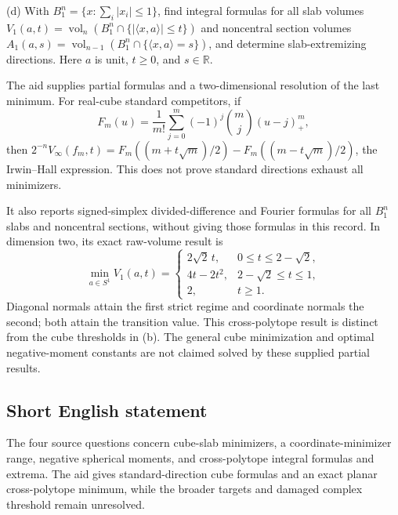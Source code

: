 \documentclass[11pt]{article}
\newcommand{\R}{\mathbb{R}}
\begin{document}
(d) With $B_1^n=\{x:\sum_i|x_i|\leq1\}$, find integral formulas for all slab volumes
$V_1(a,t)=\operatorname{vol}_n(B_1^n\cap\{|\langle x,a\rangle|\leq t\})$
and noncentral section volumes $A_1(a,s)=\operatorname{vol}_{n-1}(B_1^n\cap\{\langle x,a\rangle=s\})$, and determine slab-extremizing directions. Here $a$ is unit, $t\geq0$, and $s\in\R$.

The aid supplies partial formulas and a two-dimensional resolution of the last minimum. For real-cube standard competitors, if
\[
 F_m(u)=\frac1{m!}\sum_{j=0}^m(-1)^j\binom mj(u-j)_+^m,
\]
then $2^{-n}V_\infty(f_m,t)=F_m((m+t\sqrt m)/2)-F_m((m-t\sqrt m)/2)$, the Irwin--Hall expression. This does not prove standard directions exhaust all minimizers.

It also reports signed-simplex divided-difference and Fourier formulas for all $B_1^n$ slabs and noncentral sections, without giving those formulas in this record. In dimension two, its exact raw-volume result is
\[
 \min_{a\in S^1}V_1(a,t)=
 \begin{cases}
 2\sqrt2\,t,&0\leq t\leq2-\sqrt2,\\
 4t-2t^2,&2-\sqrt2\leq t\leq1,\\
 2,&t\geq1.
 \end{cases}
\]
Diagonal normals attain the first strict regime and coordinate normals the second; both attain the transition value. This cross-polytope result is distinct from the cube thresholds in (b). The general cube minimization and optimal negative-moment constants are not claimed solved by these supplied partial results.
\subsection{Short English statement}
The four source questions concern cube-slab minimizers, a coordinate-minimizer range, negative spherical moments, and cross-polytope integral formulas and extrema. The aid gives standard-direction cube formulas and an exact planar cross-polytope minimum, while the broader targets and damaged complex threshold remain unresolved.
\end{document}
